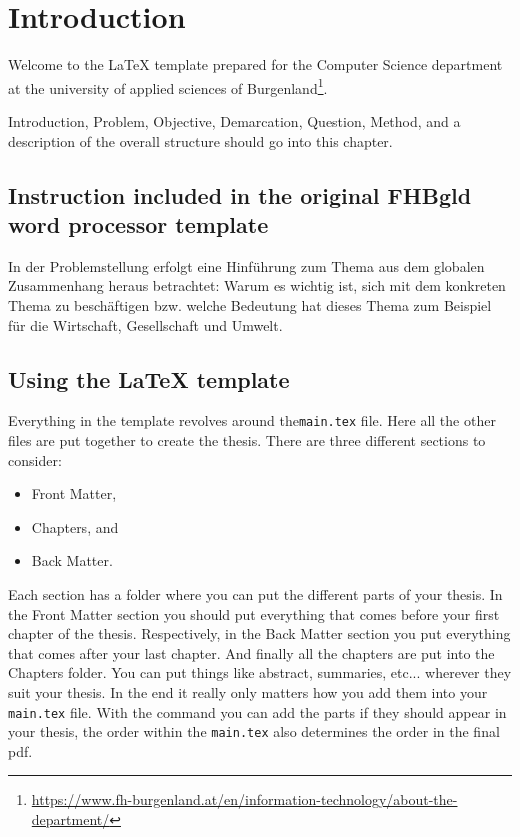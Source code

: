 
\chapter{Introduction}
Welcome to the \LaTeX{} template prepared for the Computer Science department at the university of applied sciences of Burgenland\footnote{\url{https://www.fh-burgenland.at/en/information-technology/about-the-department/}}. 

Introduction, Problem, Objective, Demarcation, Question, Method, and a description of the overall structure should go into this chapter.

\section{Instruction included in the original FHBgld word processor template}
In der Problemstellung erfolgt eine Hinführung zum Thema aus dem globalen
Zusammenhang heraus betrachtet: Warum es wichtig ist, sich mit dem konkreten
Thema zu beschäftigen bzw. welche Bedeutung hat dieses Thema zum Beispiel für die
Wirtschaft, Gesellschaft und Umwelt.

\section{Using the \LaTeX{} template}

Everything in the template revolves around the\verb|main.tex| file. Here all the other files are put together to create the thesis.
There are three different sections to consider: 
\begin{itemize}
	\item Front Matter,
	\item Chapters, and
	\item Back Matter.
\end{itemize}
Each section has a folder where you can put the different parts of your thesis. In the Front Matter section you should put everything that comes before your first chapter of the thesis. Respectively, in the Back Matter section you put everything that comes after your last chapter. And finally all the chapters are put into the Chapters folder. You can put things like abstract, summaries, etc... wherever they suit your thesis. In the end it really only matters how you add them into your \verb|main.tex| file. With the \verb|| command you can add the parts if they should appear in your thesis, the order within the \verb|main.tex| also determines the order in the final pdf.

